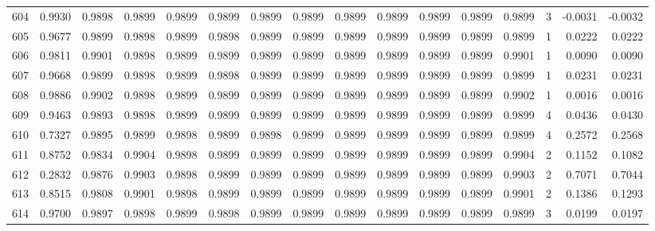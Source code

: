 \begin{tabular}{lrrrrrrrrrrrrrrr}
604 &      0.9930 &  0.9898 &  0.9899 &  0.9899 &  0.9899 &  0.9899 &  0.9899 &  0.9899 &  0.9899 &  0.9899 &   0.9899 &     0.9899 &      3 &                   -0.0031 &                    -0.0032 \\
605 &      0.9677 &  0.9899 &  0.9898 &  0.9899 &  0.9898 &  0.9899 &  0.9899 &  0.9899 &  0.9899 &  0.9899 &   0.9899 &     0.9899 &      1 &                    0.0222 &                     0.0222 \\
606 &      0.9811 &  0.9901 &  0.9898 &  0.9899 &  0.9899 &  0.9899 &  0.9899 &  0.9899 &  0.9899 &  0.9899 &   0.9899 &     0.9901 &      1 &                    0.0090 &                     0.0090 \\
607 &      0.9668 &  0.9899 &  0.9898 &  0.9899 &  0.9898 &  0.9899 &  0.9899 &  0.9899 &  0.9899 &  0.9899 &   0.9899 &     0.9899 &      1 &                    0.0231 &                     0.0231 \\
608 &      0.9886 &  0.9902 &  0.9898 &  0.9899 &  0.9899 &  0.9899 &  0.9899 &  0.9899 &  0.9899 &  0.9899 &   0.9899 &     0.9902 &      1 &                    0.0016 &                     0.0016 \\
609 &      0.9463 &  0.9893 &  0.9898 &  0.9899 &  0.9899 &  0.9899 &  0.9899 &  0.9899 &  0.9899 &  0.9899 &   0.9899 &     0.9899 &      4 &                    0.0436 &                     0.0430 \\
610 &      0.7327 &  0.9895 &  0.9899 &  0.9898 &  0.9899 &  0.9898 &  0.9899 &  0.9899 &  0.9899 &  0.9899 &   0.9899 &     0.9899 &      4 &                    0.2572 &                     0.2568 \\
611 &      0.8752 &  0.9834 &  0.9904 &  0.9898 &  0.9899 &  0.9899 &  0.9899 &  0.9899 &  0.9899 &  0.9899 &   0.9899 &     0.9904 &      2 &                    0.1152 &                     0.1082 \\
612 &      0.2832 &  0.9876 &  0.9903 &  0.9898 &  0.9899 &  0.9899 &  0.9899 &  0.9899 &  0.9899 &  0.9899 &   0.9899 &     0.9903 &      2 &                    0.7071 &                     0.7044 \\
613 &      0.8515 &  0.9808 &  0.9901 &  0.9898 &  0.9899 &  0.9899 &  0.9899 &  0.9899 &  0.9899 &  0.9899 &   0.9899 &     0.9901 &      2 &                    0.1386 &                     0.1293 \\
614 &      0.9700 &  0.9897 &  0.9898 &  0.9899 &  0.9898 &  0.9899 &  0.9899 &  0.9899 &  0.9899 &  0.9899 &   0.9899 &     0.9899 &      3 &                    0.0199 &                     0.0197 \\

\end{tabular}
